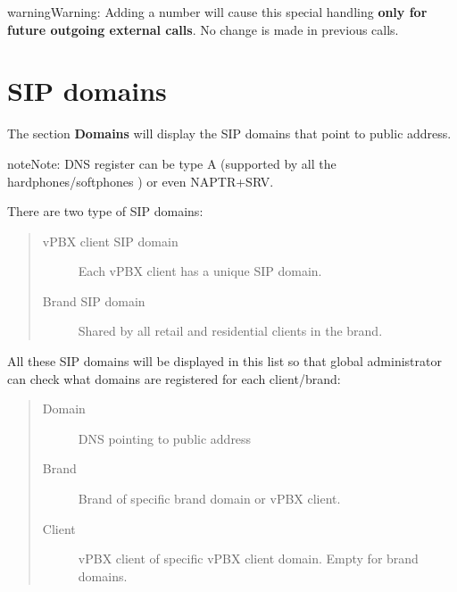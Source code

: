 \documentclass[letterpaper,10pt,english]{sphinxmanual}
\begin{document}
\begin{notice}{warning}{Warning:}
Adding a number will cause this special handling \textbf{only for future outgoing external calls}.
No change is made in previous calls.
\end{notice}
\label{administration_portal/platform/sip_domains:god-sipdomains}

\section{SIP domains}
\label{administration_portal/platform/sip_domains:sip-domains}\label{administration_portal/platform/sip_domains::doc}\label{administration_portal/platform/sip_domains:god-sipdomains}\label{administration_portal/platform/sip_domains:id1}
The section \textbf{Domains} will display the SIP domains that point to {\hyperref[administration_portal/platform/infrastructure/proxy_users:proxyusers]{}} public address.

\begin{notice}{note}{Note:}
DNS register can be type A (supported by all the hardphones/softphones
) or even NAPTR+SRV.
\end{notice}

There are two type of SIP domains:
\begin{quote}
\begin{description}
\item[{vPBX client SIP domain}] \leavevmode
Each vPBX client has a unique SIP domain.

\item[{Brand SIP domain}] \leavevmode
Shared by all retail and residential clients in the brand.

\end{description}
\end{quote}

All these SIP domains will be displayed in this list so that global administrator can check
what domains are registered for each client/brand:
\begin{quote}
\begin{description}
\item[{Domain}] \leavevmode
DNS pointing to {\hyperref[administration_portal/platform/infrastructure/proxy_users:proxyusers]{}} public address

\item[{Brand}] \leavevmode
Brand of specific brand domain or vPBX client.

\item[{Client}] \leavevmode
vPBX client of specific vPBX client domain. Empty for brand domains.

\end{description}
\end{quote}
\label{administration_portal/platform/portals:portals}
\end{document}
